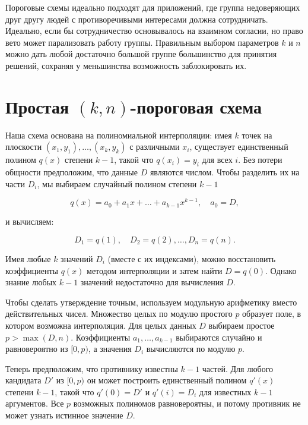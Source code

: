 \documentclass[a4paper,12pt]{article}
\begin{document}
Пороговые схемы идеально подходят для приложений, где группа недоверяющих друг другу
людей с противоречивыми интересами должна сотрудничать. Идеально, если бы
сотрудничество основывалось на взаимном согласии, но право вето может парализовать
работу группы. Правильным выбором параметров $k$ и $n$ можно дать любой достаточно
большой группе большинство для принятия решений, сохраняя у меньшинства возможность
заблокировать их.

\section{Простая $(k,n)$-пороговая схема}

Наша схема основана на полиномиальной интерполяции: имея $k$ точек на плоскости
$(x_1, y_1), \ldots, (x_k, y_k)$ с различными $x_i$, существует единственный
полином $q(x)$ степени $k-1$, такой что $q(x_i) = y_i$ для всех $i$.
Без потери общности предположим, что данные $D$ являются числом.
Чтобы разделить их на части $D_i$, мы выбираем случайный полином степени $k-1$

\begin{equation*}
q(x) = a_0 + a_1 x + \ldots + a_{k-1}x^{k-1}, \quad a_0 = D,
\end{equation*}

и вычисляем:

\begin{equation*}
D_1 = q(1), \quad D_2 = q(2), \ldots, D_n = q(n).
\end{equation*}

Имея любые $k$ значений $D_i$ (вместе с их индексами), можно восстановить коэффициенты
$q(x)$ методом интерполяции и затем найти $D = q(0)$. Однако знание любых $k-1$
значений недостаточно для вычисления $D$.

Чтобы сделать утверждение точным, используем модульную арифметику вместо действительных чисел.
Множество целых по модулю простого $p$ образует поле, в котором возможна интерполяция.
Для целых данных $D$ выбираем простое $p > \max(D, n)$. Коэффициенты
$a_1, \ldots, a_{k-1}$ выбираются случайно и равновероятно из $[0, p)$, а значения
$D_i$ вычисляются по модулю $p$.

Теперь предположим, что противнику известны $k-1$ частей. Для любого кандидата $D'$ из $[0,p)$
он может построить единственный полином $q'(x)$ степени $k-1$, такой что $q'(0) = D'$ и
$q'(i) = D_i$ для известных $k-1$ аргументов. Все $p$ возможных полиномов равновероятны,
и потому противник не может узнать истинное значение $D$.
\end{document}
